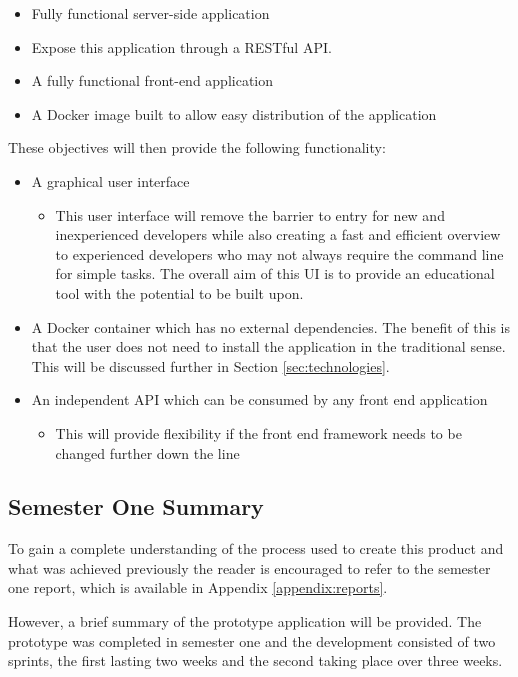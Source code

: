 \begin{itemize}
	\item Fully functional server-side application
	\item Expose this application through a \gls{REST}ful API.
	\item A fully functional front-end application
	\item A \gls{Docker image} built to allow easy distribution of the application
\end{itemize}

These objectives will then provide the following functionality:

\begin{itemize}
	\item A graphical user interface
	\begin{itemize}
		\item This user interface will remove the barrier to entry for new and inexperienced developers while also creating a fast and efficient overview to experienced developers who may not always require the command line for simple tasks. The overall aim of this \gls{UI} is to provide an educational tool with the potential to be built upon.
	\end{itemize}
	\item A \gls{Docker container} which has no external dependencies. The benefit of this is that the user does not need to install the application in the traditional sense. This will be discussed further in Section \ref{sec:technologies}.
	\item An independent API which can be consumed by any front end application
	\begin{itemize}
		\item This will provide flexibility if the front end framework needs to be changed further down the line
	\end{itemize}
\end{itemize}

\subsection{Semester One Summary}
To gain a complete understanding of the process used to create this product and what was achieved previously the reader is encouraged to refer to the semester one report, which is available in Appendix \ref{appendix:reports}.

However, a brief summary of the prototype application will be provided. The prototype was completed in semester one and the development consisted of two \glspl{sprint}, the first lasting two weeks and the second taking place over three weeks.


